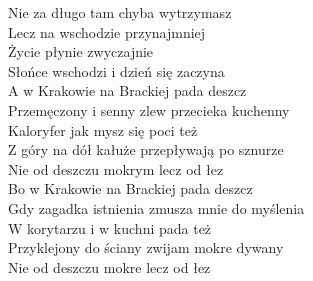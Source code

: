 \documentclass[a5paper, 10pt]{book}
\begin{document}
\begin{minipage}[t]{0.8\textwidth}
  Nie za długo tam chyba wytrzymasz\\
  Lecz na wschodzie przynajmniej\\
  Życie płynie zwyczajnie\\
  Słońce wschodzi i dzień się zaczyna\vspace*{2mm}\\
  \hspace*{5mm}A w Krakowie na Brackiej pada deszcz\\
  \hspace*{5mm}Przemęczony i senny zlew przecieka kuchenny\\
  \hspace*{5mm}Kaloryfer jak mysz się poci też\\
  \hspace*{5mm}Z góry na dół kałuże przepływają po sznurze\\
  \hspace*{5mm}Nie od deszczu mokrym lecz od łez\vspace*{2mm}\\
  \hspace*{5mm}Bo w Krakowie na Brackiej pada deszcz\\
  \hspace*{5mm}Gdy zagadka istnienia zmusza mnie do myślenia\\
  \hspace*{5mm}W korytarzu i w kuchni pada też\\
  \hspace*{5mm}Przyklejony do ściany zwijam mokre dywany\\
  \hspace*{5mm}Nie od deszczu mokre lecz od łez\vspace*{2mm}\\
\end{minipage}
\end{document}
